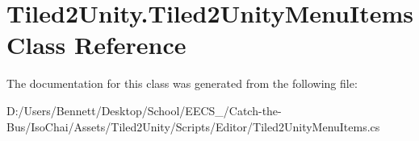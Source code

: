 \hypertarget{class_tiled2_unity_1_1_tiled2_unity_menu_items}{}\section{Tiled2\+Unity.\+Tiled2\+Unity\+Menu\+Items Class Reference}
\label{class_tiled2_unity_1_1_tiled2_unity_menu_items}


The documentation for this class was generated from the following file\+:\begin{DoxyCompactItemize}
\item 
D\+:/\+Users/\+Bennett/\+Desktop/\+School/\+E\+E\+C\+S\+\_/\+Catch-\/the-\/\+Bus/\+Iso\+Chai/\+Assets/\+Tiled2\+Unity/\+Scripts/\+Editor/Tiled2\+Unity\+Menu\+Items.\+cs\end{DoxyCompactItemize}
